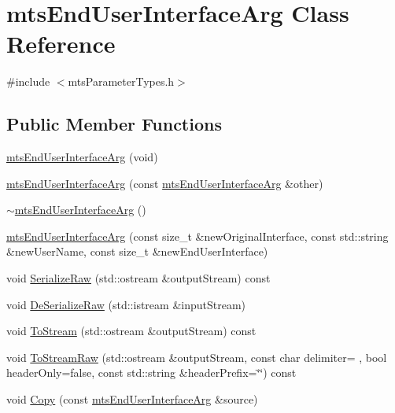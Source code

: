 \hypertarget{classmts_end_user_interface_arg}{}\section{mts\+End\+User\+Interface\+Arg Class Reference}
\label{classmts_end_user_interface_arg}


{\ttfamily \#include $<$mts\+Parameter\+Types.\+h$>$}

\subsection*{Public Member Functions}
\begin{DoxyCompactItemize}
\item 
\hyperlink{classmts_end_user_interface_arg_a8daa91521e9ae9aba41ff0a86eb8be32}{mts\+End\+User\+Interface\+Arg} (void)
\item 
\hyperlink{classmts_end_user_interface_arg_a3a8b4d5845b6b51793023f7141bd3ed9}{mts\+End\+User\+Interface\+Arg} (const \hyperlink{classmts_end_user_interface_arg}{mts\+End\+User\+Interface\+Arg} \&other)
\item 
\hyperlink{classmts_end_user_interface_arg_a18c314acc29c24c78f0b30b735812ac7}{$\sim$mts\+End\+User\+Interface\+Arg} ()
\item 
\hyperlink{classmts_end_user_interface_arg_a30628f4ff388e96bdb90da79894c94ab}{mts\+End\+User\+Interface\+Arg} (const size\+\_\+t \&new\+Original\+Interface, const std\+::string \&new\+User\+Name, const size\+\_\+t \&new\+End\+User\+Interface)
\item 
void \hyperlink{classmts_end_user_interface_arg_a4083d87feeb0463ff41500e2676d97ca}{Serialize\+Raw} (std\+::ostream \&output\+Stream) const 
\item 
void \hyperlink{classmts_end_user_interface_arg_ac46680a73fa9ad45491e281e159e5953}{De\+Serialize\+Raw} (std\+::istream \&input\+Stream)
\item 
void \hyperlink{classmts_end_user_interface_arg_af2dccb111ad6addf14e367a3e6fe1cf6}{To\+Stream} (std\+::ostream \&output\+Stream) const 
\item 
void \hyperlink{classmts_end_user_interface_arg_aedb07f8b29a24417ff3d648600838eb5}{To\+Stream\+Raw} (std\+::ostream \&output\+Stream, const char delimiter= \textquotesingle{} \textquotesingle{}, bool header\+Only=false, const std\+::string \&header\+Prefix=\char`\"{}\char`\"{}) const 
\item 
void \hyperlink{classmts_end_user_interface_arg_a8689f6f55e431f3b28dd67d44bf0d238}{Copy} (const \hyperlink{classmts_end_user_interface_arg}{mts\+End\+User\+Interface\+Arg} \&source)

\end{DoxyCompactItemize}

